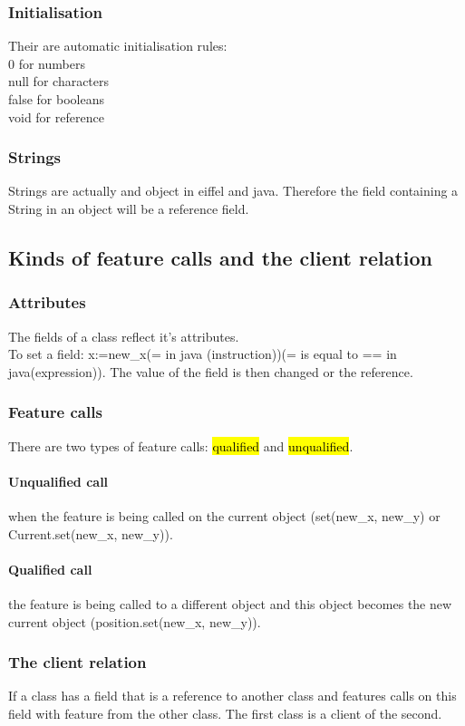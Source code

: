 \documentclass[11pt]{article}
\newcommand\tab[1][1cm]{\hspace*{#1}}
\begin{document}
\subsubsection{Initialisation}
Their are automatic initialisation rules:\\\tab 0 for numbers\\\tab null for characters\\\tab false for booleans\\\tab void for reference\\
\subsubsection{Strings}
Strings are actually and object in eiffel and java. Therefore the field containing a String in an object will be a reference field.
\subsection{Kinds of feature calls and the client relation}
\subsubsection{Attributes}
The fields of a class reflect it's attributes.\\ To set a field: x:=new\_x(= in java (instruction))(= is equal to == in java(expression)). The value of the field is then changed or the reference.
\subsubsection{Feature calls}
There are two types of feature calls: \hl{qualified} and \hl{unqualified}.
\paragraph{Unqualified call} when the feature is being called on the current object (set(new\_x, new\_y) or Current.set(new\_x, new\_y)).
\paragraph{Qualified call} the feature is being called to a different object and this object becomes the new current object (position.set(new\_x, new\_y)).
\subsubsection{The client relation}
If a class has a field that is a reference to another class and features calls on this field with feature from the other class. The first class is a client of the second.
\end{document}
